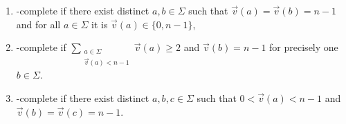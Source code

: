 \begin{lemma}
\begin{enumerate}
\item \label{constrsync:comm:single:item:NL} \NL-complete if there exist distinct $a,b \in \Sigma$ 
 such that $\vec{v}(a) = \vec{v}(b) = n - 1$
 and for all $a \in \Sigma$ it is $\vec{v}(a) \in \{0,n-1\}$,


\item \label{constrsync:comm:single:item:NP} \NP-complete if $\sum_{\substack{a \in \Sigma \\ \vec{v}(a) < n - 1}} \vec{v}(a) \ge 2$
 and $\vec{v}(b) = n - 1$ for precisely one $b \in \Sigma$.
 
%	
%	


\item \label{constrsync:comm:single:item:PSPACE} \PSPACE-complete if there exist distinct $a,b,c \in \Sigma$ 
 such that $0 < \vec{v}(a) < n - 1$
 and $\vec{v}(b) = \vec{v}(c) = n - 1$.
\end{enumerate}		
\end{lemma}
